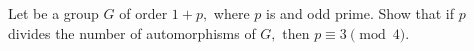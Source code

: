 Let be a group $ G $ of order $ 1+p, $ where $ p $ is and odd prime. Show that if $ p $ divides the number of automorphisms of $ G, $ then $ p\equiv 3\pmod 4. $